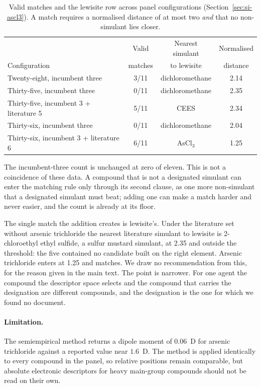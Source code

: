\documentclass[journal=jacsat,manuscript=suppinfo,margin=1in]{achemso}
\begin{document}
\begin{table}[htbp]
\centering
\caption{Valid matches and the lewisite row across panel configurations
(Section~\ref{sec:si-ascl3}). A match requires a normalised distance of at
most two \emph{and} that no non-simulant lies closer.}
\label{tab:si-ascl3}
\small
\begin{tabular}{@{}lccc@{}}
\hline
 & Valid & Nearest simulant & Normalised \\
Configuration & matches & to lewisite & distance \\
\hline
Twenty-eight, incumbent three & 3/11 & dichloromethane & 2.14 \\
Thirty-five, incumbent three & 0/11 & dichloromethane & 2.35 \\
Thirty-five, incumbent 3 + literature 5 & 5/11 & CEES & 2.34 \\
Thirty-six, incumbent three & 0/11 & dichloromethane & 2.04 \\
Thirty-six, incumbent 3 + literature 6 & 6/11 & AsCl$_3$ & 1.25 \\
\hline
\end{tabular}
\end{table}

The incumbent-three count is unchanged at zero of eleven. This is not a
coincidence of these data. A compound that is not a designated simulant can
enter the matching rule only through its second clause, as one more
non-simulant that a designated simulant must beat; adding one can make a match
harder and never easier, and the count is already at its floor.

The single match the addition creates is lewisite's. Under the literature set
without arsenic trichloride the nearest literature simulant to lewisite is
2-chloroethyl ethyl sulfide, a sulfur mustard simulant, at 2.35 and outside
the threshold: the five contained no candidate built on the right element.
Arsenic trichloride enters at 1.25 and matches. We draw no recommendation from
this, for the reason given in the main text. The point is narrower. For one
agent the compound the descriptor space selects and the compound that carries
the designation are different compounds, and the designation is the one for
which we found no document.

\paragraph*{Limitation.}
The semiempirical method returns a dipole moment of $0.06$~D for arsenic
trichloride against a reported value near $1.6$~D. The method is applied
identically to every compound in the panel, so relative positions remain
comparable, but absolute electronic descriptors for heavy main-group compounds
should not be read on their own.
\end{document}
